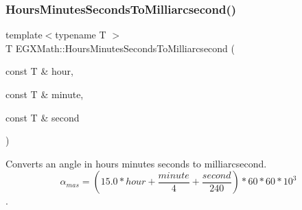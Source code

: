 \mbox{\label{group___e_g_x_math-_angle_conversions-_hours_minutes_seconds_gaf63c3ba5f75aacd268db2814575fa3f9}} 
\subsubsection{\texorpdfstring{Hours\+Minutes\+Seconds\+To\+Milliarcsecond()}{HoursMinutesSecondsToMilliarcsecond()}}
{\footnotesize\ttfamily template$<$typename T $>$ \\
T E\+G\+X\+Math\+::\+Hours\+Minutes\+Seconds\+To\+Milliarcsecond (\begin{DoxyParamCaption}\item[{const T \&}]{hour,  }\item[{const T \&}]{minute,  }\item[{const T \&}]{second }\end{DoxyParamCaption})}



Converts an angle in hours minutes seconds to milliarcsecond. \[\alpha_{mas}=(15.0 * hour + \frac{minute}{4} + \frac{second}{240}) * 60 * 60 * 10^3\]. 

